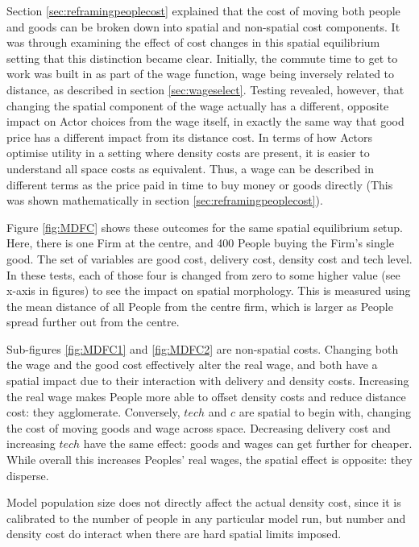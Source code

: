 Section \ref{sec:reframingpeoplecost} explained that the cost of moving both people and goods can be broken down into spatial and non-spatial cost components. It was through examining the effect of cost changes in this spatial equilibrium setting that this distinction became clear. Initially, the commute time to get to work was built in as part of the wage function, wage being inversely related to distance, as described in section \ref{sec:wageselect}. Testing revealed, however, that changing the spatial component of the wage actually has a different, opposite impact on Actor choices from the wage itself, in exactly the same way that good price has a different impact from its distance cost. In terms of how Actors optimise utility in a setting where density costs are present, it is easier to understand all space costs as equivalent. Thus, a wage can be described in different terms as the price paid in time to buy money or goods directly (This was shown mathematically in section \ref{sec:reframingpeoplecost}).

Figure \ref{fig:MDFC} shows these outcomes for the same spatial equilibrium setup. Here, there is one Firm at the centre, and 400 People buying the Firm’s single good. The set of variables are good cost, delivery cost, density cost and tech level. In these tests, each of those four is changed from zero to some higher value (see x-axis in figures) to see the impact on spatial morphology. This is measured using the mean distance of all People from the centre firm, which is larger as People spread further out from the centre. 

Sub-figures \ref{fig:MDFC1} and \ref{fig:MDFC2} are non-spatial costs. Changing both the wage and the good cost effectively alter the real wage, and both have a spatial impact due to their interaction with delivery and density costs. Increasing the real wage makes People more able to offset density costs and reduce distance cost: they agglomerate. Conversely, $tech$ and $c$ are spatial to begin with, changing the cost of moving goods and wage across space. Decreasing delivery cost and increasing $tech$ have the same effect: goods and wages can get further for cheaper. While overall this increases Peoples’ real wages, the spatial effect is opposite: they disperse. 

Model population size does not directly affect the actual density cost, since it is calibrated to the number of people in any particular model run, but number and density cost do interact when there are hard spatial limits imposed.

